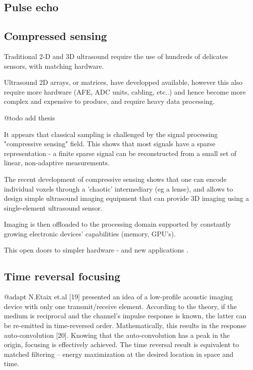 \documentclass[conference]{IEEEtran}
\begin{document}
\subsection{Pulse echo}



\subsection{Compressed sensing}

Traditional 2-D and 3D ultrasound require the use of hundreds of delicates sensors, with matching hardware. 

Ultrasound 2D arrays, or matrices, have developped available, however this also require more hardware (AFE, ADC units, cabling, etc..) and hence become more
complex and expensive to produce, and require heavy data processing.

@todo add \cite{Fedjajevs_mscthesis_14_09_2016} thesis

It appears that classical sampling is challenged by the signal processing "compressive sensing" field. This shows that most signals have a sparse representation - a finite sparse signal can be reconstructed from a small set of linear, non-adaptive measurements.

The recent development of compressive sensing shows that one can encode individual voxels through a 'chaotic' intermediary (eg a lense), and allows to design simple ultrasound imaging equipment that can provide 3D imaging using a single-element ultrasound sensor.  

Imaging is then offloaded to the processing domain supported by constantly growing electronic devices' capabilities (memory, GPU's).


This open doors to simpler hardware - and new applications \cite{kruizinga_compressive_2017}.


\cite{hua_compressed_2011}

\subsection{Time reversal focusing}

@adapt N.Etaix et.al [19] presented an idea of a low-profile acoustic imaging device with only one transmit/receive element. According to the theory, if the medium is reciprocal and the channel’s impulse response is known, the latter can be re-emitted in time-reversed order. Mathematically, this results in the response auto-convolution [20]. Knowing that the auto-convolution has a peak in the origin, focusing is effectively achieved. The time reversal result is equivalent to matched filtering – energy maximization at the desired location in space and time.
\end{document}
